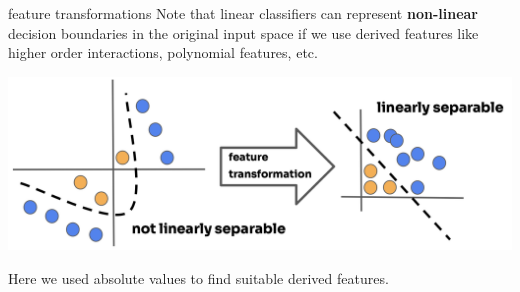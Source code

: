 \documentclass[11pt,compress,t,notes=noshow, xcolor=table]{beamer}
\begin{document}
\begin{vbframe}{feature transformations}
Note that linear classifiers can represent \textbf{non-linear} decision boundaries in the original input space if we use derived features like higher order interactions, polynomial features, etc.

\lz

\begin{center}
\includegraphics{figure_man/linear_separability-2.png} 
\end{center}

\lz

Here we used absolute values to find suitable derived features.

\end{vbframe}

\endlecture
\end{document}
